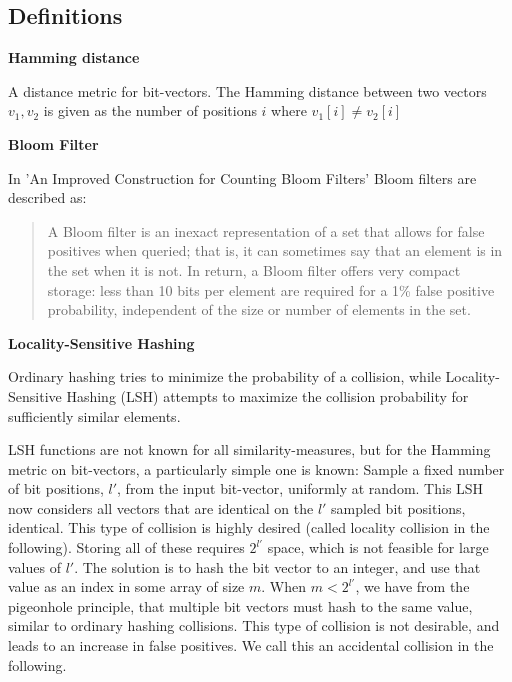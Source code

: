 \documentclass[a4paper,11pt]{article}
\begin{document}
\subsection{Definitions}
\begin{description}
\item \textbf{Hamming distance}

A distance metric for bit-vectors. The Hamming distance between two vectors $v_1, v_2$ is given as the number of positions $i$ where $v_1[i] \neq v_2[i]$

\item \textbf{Bloom Filter}

In 'An Improved Construction for Counting Bloom Filters' \cite{paper:bloom} Bloom filters are described as:
\begin{quotation}
A Bloom filter is an inexact representation of a set that allows for false positives when queried; that is, it can sometimes say that an element is in the set when it is not. In return, a Bloom filter offers very compact storage: less than 10 bits per element are required for a 1\% false positive probability, independent of the size or number of elements in the set.
\end{quotation}


\item \textbf{Locality-Sensitive Hashing}
\label{sec:lsh}

Ordinary hashing tries to minimize the probability of a collision, while Locality-Sensitive Hashing (LSH) attempts to maximize the collision probability for sufficiently similar elements.

LSH functions are not known for all similarity-measures, but for the Hamming metric on bit-vectors, a particularly simple one is known: Sample a fixed number of bit positions, $l'$, from the input bit-vector, uniformly at random.
This LSH now considers all vectors that are identical on the $l'$ sampled bit positions, identical. This type of collision is highly desired (called locality collision in the following). Storing all of these requires $2^{l'}$ space, which is not feasible for large values of $l'$. The solution is to hash the bit vector to an integer, and use that value as an index in some array of size $m$. When $m < 2^{l'}$, we have from the pigeonhole principle, that multiple bit vectors must hash to the same value, similar to ordinary hashing collisions. This type of collision is not desirable, and leads to an increase in false positives. We call this an accidental collision in the following.


\end{description}
\end{document}
